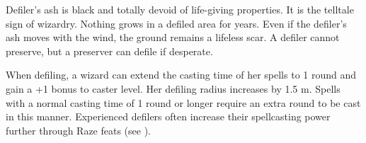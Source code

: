 Defiler's ash is black and totally devoid of life-giving properties. It is the telltale sign of wizardry. Nothing grows in a defiled area for years. Even if the defiler's ash moves with the wind, the ground remains a lifeless scar. A defiler cannot preserve, but a preserver can defile if desperate.

When defiling, a wizard can extend the casting time of her spells to 1 round and gain a +1 bonus to caster level. Her defiling radius increases by 1.5 m. Spells with a normal casting time of 1 round or longer require an extra round to be cast in this manner. Experienced defilers often increase their spellcasting power further through Raze feats (see ).
